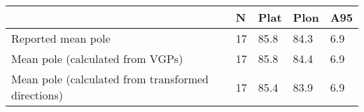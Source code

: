 \begin{tabular}{lllll}
\toprule
{} &   N &  Plat &  Plon &  A95 \\
\midrule
Reported mean pole                                 &  17 &  85.8 &  84.3 &  6.9 \\
Mean pole (calculated from VGPs)                   &  17 &  85.8 &  84.4 &  6.9 \\
Mean pole (calculated from transformed directions) &  17 &  85.4 &  83.9 &  6.9 \\
\bottomrule
\end{tabular}
